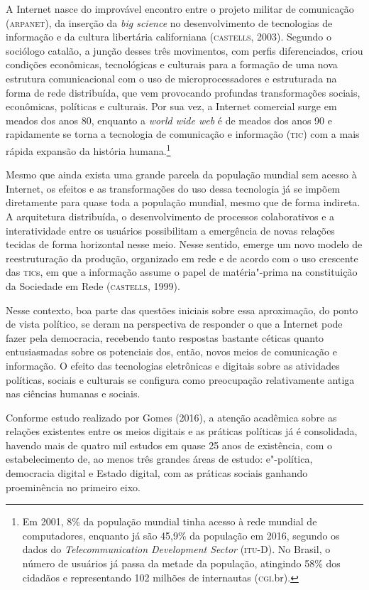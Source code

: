 \noindent{}A Internet nasce do improvável encontro entre o projeto militar de
comunicação (\textsc{arpanet}), da inserção da \emph{big science} no
desenvolvimento de tecnologias de informação e da cultura libertária
californiana (\textsc{castells}, 2003). Segundo o sociólogo catalão, a junção
desses três movimentos, com perfis diferenciados, criou condições
econômicas, tecnológicas e culturais para a formação de uma nova
estrutura comunicacional com o uso de microprocessadores e estruturada
na forma de rede distribuída, que vem provocando profundas
transformações sociais, econômicas, políticas e culturais. Por sua vez,
a Internet comercial surge em meados dos anos 80, enquanto a \emph{world
wide web} é de meados dos anos 90 e rapidamente se torna a tecnologia de
comunicação e informação (\textsc{tic}) com a mais rápida expansão da história
humana.\footnote{Em 2001, 8\% da população mundial tinha acesso à rede
  mundial de computadores, enquanto já são 45,9\% da população em 2016,
  segundo os dados do \emph{Telecommunication Development Sector}
  (\textsc{itu}-D). No Brasil, o número de usuários já passa da metade da
  população, atingindo 58\% dos cidadãos e representando 102 milhões de
  internautas (\textsc{cgi}.br).}

Mesmo que ainda exista uma grande parcela da população mundial sem
acesso à Internet, os efeitos e as transformações do uso dessa
tecnologia já se impõem diretamente para quase toda a população mundial,
mesmo que de forma indireta. A arquitetura distribuída, o
desenvolvimento de processos colaborativos e a interatividade entre os
usuários possibilitam a emergência de novas relações tecidas de forma
horizontal nesse meio. Nesse sentido, emerge um novo modelo de
reestruturação da produção, organizado em rede e de acordo com o uso
crescente das \textsc{tic}s, em que a informação assume o papel de matéria"-prima
na constituição da Sociedade em Rede (\textsc{castells}, 1999).

Nesse contexto, boa parte das questões iniciais sobre essa aproximação,
do ponto de vista político, se deram na perspectiva de responder o que a
Internet pode fazer pela democracia, recebendo tanto respostas bastante
céticas quanto entusiasmadas sobre os potenciais dos, então, novos meios
de comunicação e informação. O efeito das tecnologias eletrônicas e
digitais sobre as atividades políticas, sociais e culturais se configura
como preocupação relativamente antiga nas ciências humanas e sociais.

Conforme estudo realizado por Gomes (2016), a atenção acadêmica sobre as
relações existentes entre os meios digitais e as práticas políticas já é
consolidada, havendo mais de quatro mil estudos em quase 25 anos de
existência, com o estabelecimento de, ao menos três grandes áreas de
estudo: e"-política, democracia digital e Estado digital, com as práticas
sociais ganhando proeminência no primeiro eixo.

